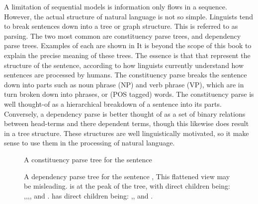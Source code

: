 \documentclass[12pt,parskip]{komatufte}
\begin{document}
A limitation of sequential models is information only flows in a sequence.
However, the actual structure of natural language is not so simple.
Linguists tend to break sentences down into a tree or graph structure.
This is referred to as parsing.
The two most common are constituency parse trees, and dependency parse trees.
Examples of each are shown in 
It is beyond the scope of this book to explain the precise meaning of these trees.
The essence is that that represent the structure of the sentence,
according to how linguists currently understand how sentences are processed by humans.
The constituency parse breaks the sentence down into parts such as noun phrase (NP) and verb phrase (VP),
which are in turn broken down into phrases, or (POS tagged) words.
The constituency parse is well thought-of as a hierarchical breakdown of a sentence into its parts.
Conversely, a dependency parse is better thought of as a set of binary relations between head-terms and there dependent terms, though this likewise does result in a tree structure.
These structures are well linguistically motivated, so it make sense to use them in the processing of natural language.

\begin{figure}
	\caption{A constituency parse tree for the sentence }
	\label{fig:consparse}
\end{figure}


\begin{figure}
	\caption{A dependency parse tree for the sentence ,
	This flattened view may be misleading.
	 is at the peak of the tree, with direct children	being:
	,,,,
	and .
	 has direct children being: ,, and .
}
	\label{fig:depparse}
\end{figure}


\end{document}
